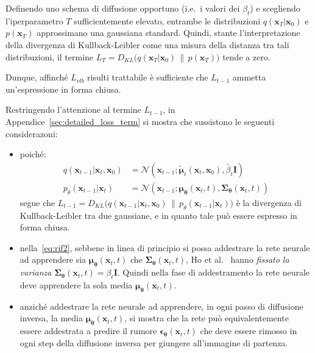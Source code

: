 \begin{oss}
    Definendo uno schema di diffusione opportuno (i.e.\ i valori dei $\beta_t$)
    e scegliendo l'iperparametro $T$ sufficientemente elevato, entrambe le distribuzioni 
    $q(\mathbf{x}_T|\mathbf{x}_0)$ e $p(\mathbf{x}_T)$ approssimano una gaussiana standard. 
    Quindi, stante l'interpretazione della divergenza di Kullback-Leibler come una misura della distanza tra tali distribuzioni,
    il termine $L_T=D_{KL}\bigl(q(\mathbf{x}_T|\mathbf{x}_0)\,\|\,p(\mathbf{x}_T)\bigr)$ tende a zero.
\end{oss}
\noindent Dunque, affinché $L_{vlb}$ risulti trattabile è sufficiente che $L_{t-1}$ ammetta un'espressione in forma chiusa.

\noindent Restringendo l'attenzione al termine $L_{t-1}$, 
in Appendice~\ref{sec:detailed_loss_term} si mostra che sussistono le seguenti considerazoni:
\begin{itemize}
\item poiché:
\begin{align}
    q(\mathbf{x}_{t-1}|\mathbf{x}_t,\mathbf{x}_0) &= \mathcal{N}(\mathbf{x}_{t-1}; \tilde{\bm{\mu}}_{t}(\mathbf{x}_t,\mathbf{x}_0),\tilde{\beta_t} \bm{I}) \label{eq:rif1}\\
    p_{\theta}(\mathbf{x}_{t-1}|\mathbf{x}_t)&=\mathcal{N}(\mathbf{x}_{t-1};\bm{\mu}_{\bm{\theta}}(\mathbf{x}_t,t),\bm{\Sigma}_{\bm{\theta}}(\mathbf{x}_t,t)) \label{eq:rif2}
\end{align}
segue che $L_{t-1}=D_{KL}\bigl(q(\mathbf{x}_{t-1}|\mathbf{x}_t,\mathbf{x}_0)\,\|\,p_{\theta}(\mathbf{x}_{t-1}|\mathbf{x}_t)\bigr)$ è 
la divergenza di Kullback-Leibler tra due gaussiane, e in quanto tale può essere espresso in forma chiusa. 
\item nella~\eqref{eq:rif2}, sebbene in linea di principio si possa addestrare 
la rete neurale ad apprendere sia $\bm{\mu}_{\bm{\theta}}(\mathbf{x}_t,t)$ che $\bm{\Sigma}_{\bm{\theta}}(\mathbf{x}_t,t)$, Ho et al.~\cite{ho2020} 
hanno \emph{fissato la varianza}  $\bm{\Sigma}_{\bm{\theta}}(\mathbf{x}_t,t)=\beta_t\bm{I}$. Quindi nella fase di addestramento 
la rete neurale deve apprendere la sola media $\bm{\mu}_{\bm{\theta}}(\mathbf{x}_t,t)$.
\item anziché addestrare la rete neurale ad apprendere, in ogni passo di diffusione inversa, la media $\bm{\mu}_{\bm{\theta}}(\mathbf{x}_t,t)$, 
si mostra che la rete può equivalentemente essere addestrata a predire il rumore $\bm{\epsilon}_{\bm{\theta}}(\mathbf{x}_t,t)$
che deve essere rimosso in ogni step della diffusione inversa per giungere all'immagine di partenza.
\end{itemize}

